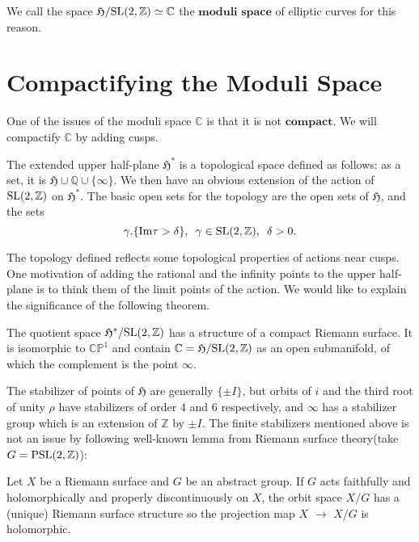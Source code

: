 \documentclass[a4paper,11pt]{article}
\begin{document}
We call the space $\mathfrak{H}/\textnormal{SL}(2,\mathbb{Z})\simeq\mathbb{C}$ the $\textbf{moduli space}$ of elliptic curves for this reason.

\section{Compactifying the Moduli Space}

One of the issues of the moduli space $\mathbb{C}$ is that it is not $\textbf{compact}$.
We will compactify $\mathbb{C}$ by adding cusps.

\begin{defn}
The extended upper half-plane $\mathfrak{H}^*$ is a topological space defined as follows: as a set, it is $\mathfrak{H}\cup\mathbb{Q}\cup\{\infty\}$.
We then have an obvious extension of the action of $\textnormal{SL}(2,\mathbb{Z})$ on $\mathfrak{H}^*$.
The basic open sets for the topology are the open sets of $\mathfrak{H}$, and the sets
\[
\gamma.\{\textnormal{Im}\tau > \delta \}, \enskip \gamma \in \textnormal{SL}(2,\mathbb{Z}), \enskip \delta > 0.
\]
\end{defn}

The topology defined reflects some topological properties of actions near cusps.
One motivation of adding the rational and the infinity points to the upper half-plane is to think them of the limit points of the action.
We would like to explain the significance of the following theorem.

\begin{thm}
The quotient space $\mathfrak{H}^*/\textnormal{SL}(2,\mathbb{Z})$ has a structure of a compact Riemann surface.
It is isomorphic to $\mathbb{CP}^1$ and contain $\mathbb{C}=\mathfrak{H}/\textnormal{SL}(2,\mathbb{Z})$ as an open submanifold, of which the complement is the point $\infty$.
\end{thm}

The stabilizer of points of $\mathfrak{H}$ are generally $\{\pm$$I\}$, but orbits of $i$ and the third root of unity $\rho$ have stabilizers of order $4$ and $6$ respectively, and $\infty$ has a stabilizer group which is an extension of $\mathbb{Z}$ by $\pm$$I$.
The finite stabilizers mentioned above is not an issue by following well-known lemma from Riemann surface theory(take $G=\textnormal{PSL}(2,\mathbb{Z})$):
\begin{lem}
Let $X$ be a Riemann surface and $G$ be an abstract group.
If $G$ acts faithfully and holomorphically and properly discontinuously on $X$, the orbit space $X/G$ has a (unique) Riemann surface structure so the projection map $X$ $\to$ $X/G$ is holomorphic.
\end{lem}
\end{document}

